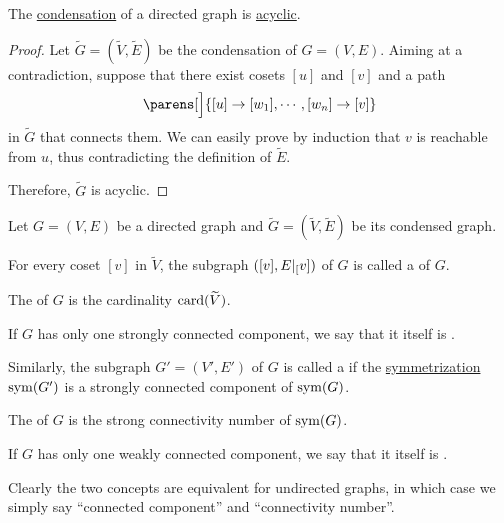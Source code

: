 \begin{proposition}\label{thm:graph_condensation_is_acyclic_dag}
  The \hyperref[def:graph_condensation]{condensation} of a directed graph is \hyperref[def:graph_cycle]{acyclic}.
\end{proposition}
\begin{proof}
  Let \( \widetilde{G} = (\widetilde{V}, \widetilde{E}) \) be the condensation of \( G = (V, E) \). Aiming at a contradiction, suppose that there exist cosets \( [u] \) and \( [v] \) and a path
  \begin{equation*}
    \parens[\Big]{ [u] \to [w_1], \cdots, [w_n] \to [v] }
  \end{equation*}
  in \( \widetilde{G} \) that connects them. We can easily prove by induction that \( v \) is reachable from \( u \), thus contradicting the definition of \( \widetilde{E} \).

  Therefore, \( \widetilde{G} \) is acyclic.
\end{proof}

\begin{definition}\label{def:graph_connectedness}
  Let \( G = (V, E) \) be a directed graph and \( \widetilde{G} = (\widetilde{V}, \widetilde{E}) \) be its condensed graph.

  \begin{thmenum}
     For every coset \( [v] \) in \( \widetilde{V} \), the subgraph \( ([v], E\vert_[v]) \) of \( G \) is called a  of \( G \).

    The  of \( G \) is the cardinality \( \operatorname{card}(\widetilde{V}) \).

    If \( G \) has only one strongly connected component, we say that it itself is .

     Similarly, the subgraph \( G' = (V', E') \) of \( G \) is called a  if the \hyperref[rem:undirected_graphs_as_directed]{symmetrization} \( \operatorname{sym}(G') \) is a strongly connected component of \( \operatorname{sym}(G) \).

    The  of \( G \) is the strong connectivity number of \( \operatorname{sym}(G) \).

    If \( G \) has only one weakly connected component, we say that it itself is .
  \end{thmenum}

  Clearly the two concepts are equivalent for undirected graphs, in which case we simply say \enquote{connected component} and \enquote{connectivity number}.
\end{definition}

